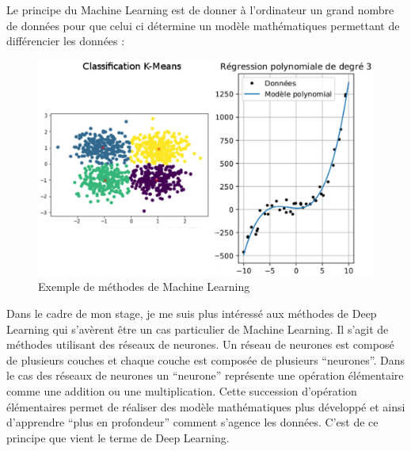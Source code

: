 \documentclass{book}
\newcommand{\p}{\vspace{0.2cm}}
\begin{document}
		Le principe du Machine Learning est de donner à l'ordinateur un grand nombre de données pour que celui ci détermine un modèle mathématiques permettant de différencier les données :
		\begin{figure}
			\begin{center}
				\includegraphics[scale = 0.8]{annex/ex_mach_lr}
				\caption{Exemple de méthodes de Machine Learning}
				\label{example}
			\end{center}
		\end{figure}\p

		Dans le cadre de mon stage, je me suis plus intéressé aux méthodes de Deep Learning qui s'avèrent être un cas particulier de Machine Learning. Il s'agit de méthodes utilisant des réseaux de neurones. Un réseau de neurones est composé de plusieurs couches et chaque couche est composée de plusieurs ``neurones''. Dans le cas des réseaux de neurones un ``neurone'' représente une opération élémentaire comme une addition ou une multiplication. Cette succession d'opération élémentaires permet de réaliser des modèle mathématiques plus développé et ainsi d'apprendre ``plus en profondeur'' comment s'agence les données. C'est de ce principe que vient le terme de Deep Learning.\p
\end{document}
